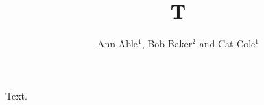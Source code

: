 \documentclass{jfm}
\title{T}
\author{Ann Able$^1$, Bob Baker$^2$ and Cat Cole$^1$}
\affiliation{$^1$Univ A, $^2$Univ B}
\begin{document}
\maketitle
Text.
\end{document}
